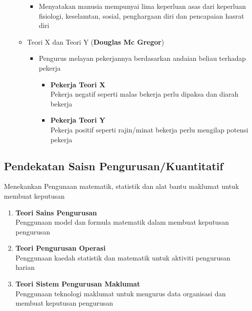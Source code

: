 \documentclass{book}
\begin{document}
\begin{multicols*}{2}
\begin{enumerate}
\begin{itemize}[leftmargin=*]
\begin{itemize}[leftmargin=*]
              \item Menyatakan manusia mempunyai lima keperluan asas dari keperluan fisiologi,
                keselamtan, sosial, penghargaan diri dan pencapaian hasrat diri
            \end{itemize}
          \item Teori X dan Teori Y (\textbf{Douglas Mc Gregor})
            \begin{itemize}[leftmargin=*]
              \item Pengurus melayan pekerjannya berdasarkan andaian beliau terhadap pekerja 
                \begin{itemize}[leftmargin=*]
                  \item \textbf{Pekerja Teori X} \\
                    Pekerja negatif seperti malas bekerja perlu dipaksa dan diarah bekerja
                  \item \textbf{Pekerja Teori Y} \\ 
                    Pekerja positif seperti rajin/minat bekerja perlu mengilap potensi pekerja
                \end{itemize}
            \end{itemize}
        \end{itemize}
    \end{enumerate}
    
    \subsection*{Pendekatan Saisn Pengurusan/Kuantitatif}
    Menekankan Pengunaan matematik, statistik dan alat bantu maklumat untuk membuat keputusan
    \vfill\null\columnbreak
    \begin{enumerate}
      \item \textbf{Teori Sains Pengurusan} \\
        Penggunaan model dan formula matematik dalam membuat keputusan pengurusan
      \item \textbf{Teori Pengurusan Operasi} \\
        Penggunaan kaedah statistik dan matematik untuk aktiviti pengurusan harian
      \item \textbf{Teori Sistem Pengurusan Maklumat} \\
        Penggunaan teknologi maklumat untuk mengurus data organisasi dan membuat keputusan pengurusan
    \end{enumerate}


\end{multicols*}
\end{document}
